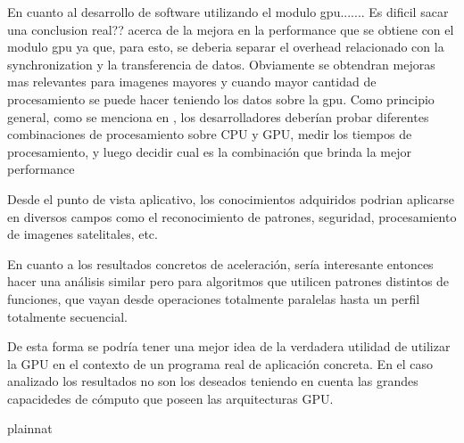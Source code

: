 \documentclass[a4paper,10pt]{report}
\begin{document}
En cuanto al desarrollo de software utilizando el modulo gpu.......
Es dificil sacar una conclusion   real??  acerca de la mejora en la performance que se obtiene con el modulo gpu ya que, para esto, se deberia separar el overhead relacionado con la synchronization y la transferencia de datos.
Obviamente se obtendran mejoras mas relevantes para imagenes mayores y cuando mayor cantidad de procesamiento se puede hacer teniendo los datos sobre la gpu.
Como principio general, como se menciona en  \cite{pulli2012real}  , los desarrolladores deberían probar diferentes combinaciones de procesamiento sobre CPU y GPU, medir los tiempos de procesamiento, y luego decidir cual es la combinación que brinda la mejor performance



Desde el punto de vista aplicativo, los conocimientos adquiridos podrian aplicarse en diversos campos como el reconocimiento de patrones, seguridad, procesamiento de imagenes satelitales, etc.

En cuanto a los resultados concretos de aceleración, sería interesante entonces hacer una análisis similar pero para algoritmos que utilicen patrones distintos de funciones, que vayan desde operaciones totalmente paralelas hasta un perfil totalmente secuencial.













De esta forma se podría tener una mejor idea de la verdadera utilidad de utilizar la GPU en el contexto de un programa real de aplicación concreta. 
En el caso analizado los resultados no son los deseados teniendo en cuenta las grandes capacidedes de cómputo que poseen las arquitecturas GPU.




 {plainnat}




  
\end{document}
